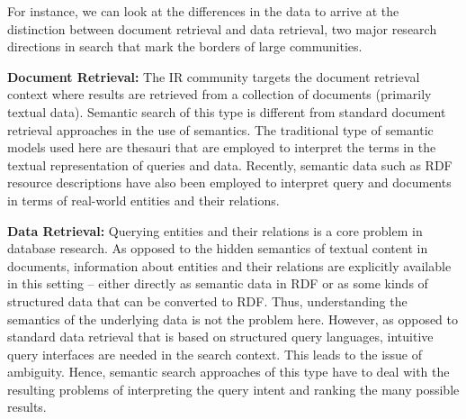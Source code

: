 For instance, we can look at the differences in the data to arrive at the distinction between document retrieval and data retrieval, two major research directions in search that mark the borders of large communities. 

\textbf{Document Retrieval:} The IR community targets the document retrieval context where results are retrieved from a collection of documents (primarily textual data). Semantic search of this type is different from standard document retrieval approaches in the use of semantics. The traditional type of semantic models used here are thesauri that are employed to interpret the terms in the textual representation of queries and data. Recently, semantic data such as RDF resource descriptions have also been employed to interpret query and documents in terms of real-world entities and their relations. 

\textbf{Data Retrieval:} Querying entities and their relations is a core problem in database research. As opposed to the hidden semantics of textual content in documents, information about entities and their relations are explicitly available in this setting -- either directly as semantic data in RDF or as some kinds of structured data that can be converted to RDF. Thus, understanding the semantics of the underlying data is not the problem here. However, as opposed to standard data retrieval that is based on structured query languages, intuitive query interfaces are needed in the search context. This leads to the issue of ambiguity. Hence, semantic search approaches of this type have to deal with the resulting problems of interpreting the query intent and ranking the many possible results. 


